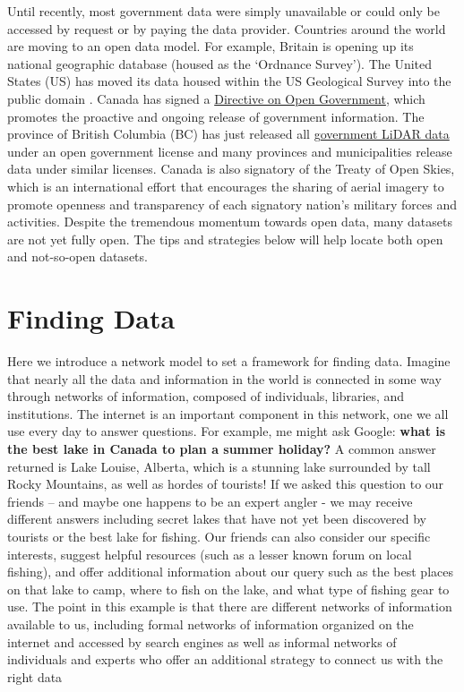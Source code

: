 \documentclass[
]{book}
\begin{document}
Until recently, most government data were simply unavailable or could only be accessed by request or by paying the data provider. Countries around the world are moving to an open data model. For example, Britain is opening up its national geographic database (housed as the `Ordnance Survey'). The United States (US) has moved its data housed within the US Geological Survey into the public domain \citep{usgs_copyrights_nodate}. Canada has signed a \href{https://www.tbs-sct.gc.ca/pol/doc-eng.aspx?id=28108}{Directive on Open Government}, which promotes the proactive and ongoing release of government information. The province of British Columbia (BC) has just released all \href{https://governmentofbc.maps.arcgis.com/apps/MapSeries/index.html?appid=d06b37979b0c4709b7fcf2a1ed458e03}{government LiDAR data} under an open government license and many provinces and municipalities release data under similar licenses. Canada is also signatory of the Treaty of Open Skies, which is an international effort that encourages the sharing of aerial imagery to promote openness and transparency of each signatory nation's military forces and activities. Despite the tremendous momentum towards open data, many datasets are not yet fully open. The tips and strategies below will help locate both open and not-so-open datasets.

\section{Finding Data}\label{finding-data}

Here we introduce a network model to set a framework for finding data. Imagine that nearly all the data and information in the world is connected in some way through networks of information, composed of individuals, libraries, and institutions. The internet is an important component in this network, one we all use every day to answer questions. For example, me might ask Google: \textbf{what is the best lake in Canada to plan a summer holiday?} A common answer returned is Lake Louise, Alberta, which is a stunning lake surrounded by tall Rocky Mountains, as well as hordes of tourists! If we asked this question to our friends -- and maybe one happens to be an expert angler - we may receive different answers including secret lakes that have not yet been discovered by tourists or the best lake for fishing. Our friends can also consider our specific interests, suggest helpful resources (such as a lesser known forum on local fishing), and offer additional information about our query such as the best places on that lake to camp, where to fish on the lake, and what type of fishing gear to use. The point in this example is that there are different networks of information available to us, including formal networks of information organized on the internet and accessed by search engines as well as informal networks of individuals and experts who offer an additional strategy to connect us with the right data
\end{document}

